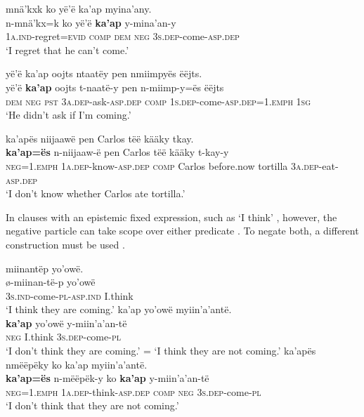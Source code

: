 \documentclass[output=paper,colorlinks,citecolor=brown,draft]{langscibook}
\begin{document}
\ea\label{ex:mix:85}
    \glll mnä’kxk {\ob}ko yë’ë ka’ap myina’any{\cb}.\\
          n-mnä’kx=k {\db}ko yë’ë \textbf{ka’ap} y-mina’an-y\\
          1\textsc{a}.\textsc{ind}{}-regret=\textsc{evid} \textsc{comp} \textsc{dem} \textsc{neg} \textsc{3s.dep}{}-come-\textsc{asp.dep}\\
    \glt ‘I regret that he can’t come.’
\z

\ea\label{ex:mix:86}
    \glll yë’ë ka’ap oojts ntaatëy {\ob}pen nmiimpyës ëëjts{\cb}. \\
          yë’ë \textbf{ka’ap} oojts t-naatë-y {\db}pen n-miimp-y=ës ëëjts \\
          \textsc{dem} \textsc{neg} \textsc{pst} \textsc{3a.dep}{}-ask-\textsc{asp.dep} \textsc{comp} \textsc{1s.dep-}come-\textsc{asp.dep=1.emph} \textsc{1sg}\\
    \glt ‘He didn’t ask if I’m coming.’
\z

\ea\label{ex:mix:87}
    \glll ka’apës niijaawë {\ob}pen Carlos tëë kääky tkay{\cb}.\\
        \textbf{ka’ap=ës} n-niijaaw-ë {\db}pen Carlos tëë kääky t-kay-y\\
        \textsc{neg=1.emph} \textsc{1a.dep}{}-know-\textsc{asp.dep} \textsc{comp} Carlos before.now tortilla \textsc{3a.dep-}eat-\textsc{asp.dep} \\
    \glt ‘I don’t know whether Carlos ate tortilla.’
\z

In clauses with an epistemic fixed expression, such as ‘I think’ , however, the negative particle can take scope over either predicate . To negate both, a different construction must be used .

\ea\label{ex:mix:88}
    \ea\label{ex:mix:88a}
        \glll miinantëp yo’owë. \\ 
              ø-miinan-të-p yo’owë\\
              \textsc{3s.ind}{}-come-\textsc{pl-asp.ind} I.think\\
        \glt ‘I think they are coming.’
    \ex\label{ex:mix:88b}
        \glll ka’ap yo’owë myiin’a’antë.\\
             \textbf{ka’ap} yo’owë y-miin’a’an-të\\
             \textsc{neg} I.think \textsc{3s.dep}{}-come-\textsc{pl}\\
        \glt ‘I don’t think they are coming.’ = ‘I think they are not coming.’
    \ex\label{ex:mix:88c}
        \glll ka’apës nmëëpëky ko ka’ap myiin’a’antë.\\
             \textbf{ka’ap=ës} n-mëëpëk-y ko \textbf{ka’ap} y-miin’a’an-të\\
             \textsc{neg=1.emph} \textsc{1a.dep-}think\textsc{-asp.dep} \textsc{comp} \textsc{neg} \textsc{3s.dep}-come-\textsc{pl}\\
        \glt ‘I don’t think that they are not coming.’
    \z
\z 
\end{document}
